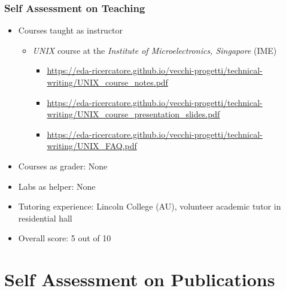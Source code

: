 \documentclass[xcolor={usenames,dvipsnames},hyperref={hyperindex,bookmarks}]{beamer}
\begin{document}
\frame
{
	\frametitle{Self Assessment on Teaching}

	\begin{itemize} \itemsep -2pt
	\item Courses taught as instructor %
		\begin{itemize} %
		\item {\it UNIX} course at the {\it Institute of Microelectronics, Singapore} (IME)
			\begin{itemize}
			\item {\scriptsize \url{https://eda-ricercatore.github.io/vecchi-progetti/technical-writing/UNIX_course_notes.pdf}}
			\item {\scriptsize \url{https://eda-ricercatore.github.io/vecchi-progetti/technical-writing/UNIX_course_presentation_slides.pdf}}
			\item {\scriptsize \url{https://eda-ricercatore.github.io/vecchi-progetti/technical-writing/UNIX_FAQ.pdf}}
			\end{itemize}
		\end{itemize}
	\item Courses as grader: None
	\item Labs as helper: None
	\item Tutoring experience: Lincoln College (AU), volunteer academic tutor in residential hall
	\item Overall score: 5 out of 10
	\end{itemize}
}




\section{Self Assessment on Publications}
\end{document}
